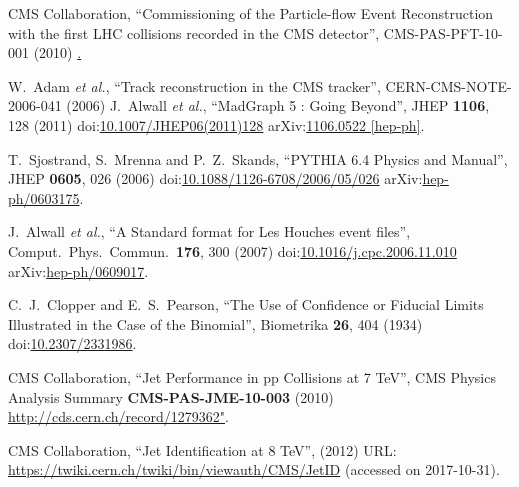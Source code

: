 \begin{thebibliography}{99}
CMS Collaboration, ``Commissioning of the Particle-flow Event Reconstruction with the first LHC collisions recorded in the CMS detector'', CMS-PAS-PFT-10-001 (2010) \href{http://cds.cern.ch/record/1247373}.

W.~Adam {\it et al.}, ``Track reconstruction in the CMS tracker'',
CERN-CMS-NOTE-2006-041 (2006) \href{http://cds.cern.ch/record/934067}



J.~Alwall {\it et al.}, ``MadGraph 5 : Going Beyond'', JHEP {\bf 1106}, 128 (2011) doi:\href{https://doi.org/10.1007/JHEP06(2011)128}{10.1007/JHEP06(2011)128} arXiv:\href{https://arxiv.org/abs/1106.0522}{1106.0522 [hep-ph]}.

T.~Sjostrand, S.~Mrenna and P.~Z.~Skands, ``PYTHIA 6.4 Physics and Manual'', JHEP {\bf 0605}, 026 (2006) doi:\href{http://dx.doi.org/10.1088/1126-6708/2006/05/026}{10.1088/1126-6708/2006/05/026} arXiv:\href{https://arxiv.org/abs/hep-ph/0603175}{hep-ph/0603175}.
 
J.~Alwall {\it et al.}, ``A Standard format for Les Houches event files'', Comput.\ Phys.\ Commun.\  {\bf 176}, 300 (2007) doi:\href{http://dx.doi.org/10.1016/j.cpc.2006.11.010}{10.1016/j.cpc.2006.11.010} arXiv:\href{https://arxiv.org/abs/hep-ph/0609017}{hep-ph/0609017}.
 
C.~J.~Clopper and E.~S.~Pearson, ``The Use of Confidence or Fiducial Limits Illustrated in the Case of the Binomial'', Biometrika {\bf 26}, 404 (1934) doi:\href{http://www.jstor.org/stable/2331986}{10.2307/2331986}.

CMS Collaboration, ``Jet Performance in pp Collisions at 7 TeV'', CMS Physics Analysis Summary {\bf CMS-PAS-JME-10-003} (2010) \url{http://cds.cern.ch/record/1279362"}.

CMS Collaboration, ``Jet Identification at 8 TeV'', (2012) URL: \url{https://twiki.cern.ch/twiki/bin/viewauth/CMS/JetID} (accessed on 2017-10-31).



\end{thebibliography}
